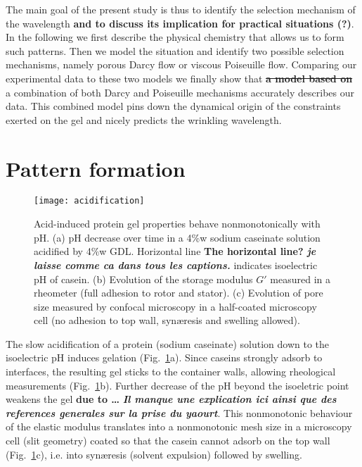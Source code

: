 \documentclass[twocolumn,superscriptaddress,showpacs,preprintnumbers,
amsmath,amssymb,prl]{revtex4-1}
\newcommand{\seb}[1]{\textbf{\color{blue}#1}} %
\newcommand{\sseb}[1]{\sout{\textbf{\color{blue}#1}}} %
\begin{document}
The main goal of the present study is thus to identify the selection mechanism of the wavelength  \seb{and to discuss its implication for practical situations (?)}. In the following we first describe the physical chemistry that allows us to form such patterns. Then we  model the situation and identify two possible selection mechanisms, namely porous Darcy flow or viscous Poiseuille flow. Comparing our experimental data to these two models we finally show that \sseb{a model based on} a combination of both Darcy and Poiseuille mechanisms accurately describes our data. This combined model pins down the dynamical origin of the constraints exerted on the gel and nicely predicts the wrinkling wavelength.

\section*{Pattern formation}

\begin{figure}[b]
	\texttt{[image: acidification]}
	\caption{Acid-induced protein gel properties behave nonmonotonically with pH. (a) pH decrease over time in a 4\%w sodium caseinate solution acidified by 4\%w GDL. Horizontal line \seb{The horizontal line? \it je laisse comme ca dans tous les captions.} indicates isoelectric pH of casein. (b) Evolution of the storage modulus $G'$ measured in a rheometer (full adhesion to rotor and stator). (c) Evolution of pore size measured by confocal microscopy in a half-coated microscopy cell (no adhesion to top wall, syn\ae{}resis and swelling allowed).}
	\label{fig:acidification}
\end{figure}


The slow acidification of a protein (sodium caseinate) solution down to the isoelectric pH induces gelation (Fig.~\ref{fig:acidification}a). Since caseins strongly adsorb to interfaces, the resulting gel sticks to the container walls, allowing rheological measurements (Fig.~\ref{fig:acidification}b). Further decrease of the pH beyond the isoeletric point weakens the gel \seb{due to \dots} \seb{\it Il manque une explication ici ainsi que des references generales sur la prise du yaourt}. This nonmonotonic behaviour of the elastic modulus translates into a nonmonotonic mesh size in a microscopy cell (slit geometry) coated so that the casein cannot adsorb on the top wall (Fig.~\ref{fig:acidification}c), i.e. into syn\ae{}resis (solvent expulsion) followed by swelling.
\end{document}
